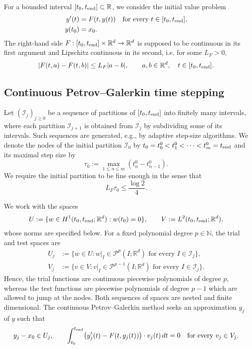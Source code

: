 \documentclass[10pt,reqno]{amsart}
\theoremstyle{definition}
\theoremstyle{remark}
\newcommand{\R}{\mathbb R}
\newcommand{\N}{\mathbb N}
\begin{document}
\noindent For a bounded interval $[t_0,t_{\rm end}] \subset \R$, we consider the initial value problem
\begin{align*}
    y'(t)&=F(t,y(t))\quad\text{for every }t\in [t_0,t_{\rm end}],\\
     y(t_0)&=x_0.
\end{align*}
The right-hand side $F:[t_0,t_{\rm end}]\times\R^d\to\R^d$ is supposed to be continuous in its first
argument and Lipschitz continuous in its second, i.e. for some $L_F>0$,
\begin{equation}\label{eq:ode-weighted-lipschitz}
  |F(t,a)-F(t,b)|\le L_F|a-b|,
  \qquad a,b\in\R^d, \quad t \in [t_0,t_{\rm end}].
\end{equation}

\subsection{Continuous Petrov--Galerkin time stepping}
\noindent
Let $(\mathcal I_j)_{j\ge0}$ be a sequence of partitions of $[t_0,t_{\rm end}]$ into finitely many intervals, where each partition $\mathcal I_{j+1}$ is obtained from $\mathcal I_j$ by subdividing some of its intervals. Such sequences are generated, e.g., by adaptive step-size algorithms. We denote the nodes of the initial partition $\mathcal I_0$ by $t_0=t_0^0<t_1^0<\cdots<t_m^0=t_{\rm end}$ and its maximal step size by
\[
  \tau_0:=\max_{1\le n\le m}(t_n^0-t_{n-1}^0).
\]
We require the initial partition to be fine enough in the sense that
\begin{equation}\label{eq:ode-step}
  L_F\tau_0\le\frac{\log 2}{4}.
\end{equation}

\noindent
We work with the spaces
\[
  U:=\{w\in H^1(t_0,t_{\rm end};\R^d):w(t_0)=0\},
  \qquad V:=L^2(t_0,t_{\rm end};\R^d),
\]
whose norms are specified below. For a fixed polynomial degree $p\in\N$, the trial and test spaces are
\begin{align*}
  U_j&:=\{w\in U:w|_I\in\mathcal P^p(I;\R^d)
                         \text{ for every }I\in\mathcal I_j\},\\
  V_j&:=\{v\in V:v|_I\in\mathcal P^{p-1}(I;\R^d)
                         \text{ for every }I\in\mathcal I_j\}.
\end{align*}
Hence, the trial functions are continuous piecewise polynomials of degree $p$, whereas the test functions are piecewise polynomials of degree $p-1$ which are allowed to jump at the nodes. Both sequences of spaces are nested and finite dimensional. The continuous Petrov--Galerkin method seeks an approximation $y_j$ of $y$ such that
\begin{equation}\label{eq:ode-cg}
  y_j-x_0\in U_j,\qquad
  \int_{t_0}^{t_{\rm end}}\bigl(y_j'(t)-F(t,y_j(t))\bigr)\cdot v_j(t)\,dt=0
  \quad\text{for every }v_j\in V_j.
\end{equation}
\end{document}
